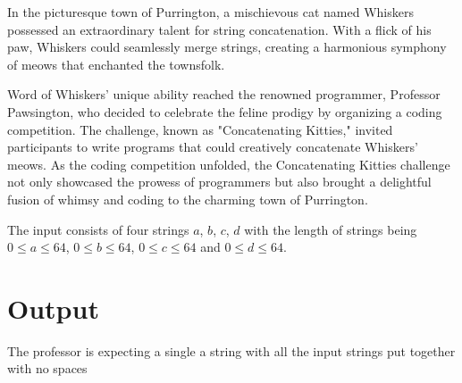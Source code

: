 In the picturesque town of Purrington, a mischievous cat named Whiskers possessed an extraordinary talent for string concatenation. With a flick of his paw, Whiskers could seamlessly merge strings, creating a harmonious symphony of meows that enchanted the townsfolk.

Word of Whiskers' unique ability reached the renowned programmer, Professor Pawsington, who decided to celebrate the feline prodigy by organizing a coding competition. The challenge, known as "Concatenating Kitties," invited participants to write programs that could creatively concatenate Whiskers' meows. As the coding competition unfolded, the Concatenating Kitties challenge not only showcased the prowess of programmers but also brought a delightful fusion of whimsy and coding to the charming town of Purrington.

\begin{Input}
The input consists of four strings $a$, $b$, $c$, $d$ with the length of strings being
$0\leq a\leq 64$,
$0\leq b\leq 64$, 
$0\leq c\leq 64$ and
$0\leq d\leq 64$.
\end{Input}

\section{Output}
The professor is expecting a single a string with all the input strings put together with no spaces
